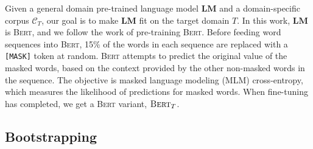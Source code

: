\documentclass[10pt, conference, compsocconf]{IEEEtran}
\newcommand{\bert}{\textsc{Bert}\xspace}
\begin{document}
Given a general domain pre-trained language model $\mathbf{LM}$ and a domain-specific corpus $\mathcal{C}_T$, 
our goal is to make $\mathbf{LM}$ fit on the target domain $T$.
In this work, $\mathbf{LM}$ is \bert, and we follow the work of pre-training \bert\cite{devlin2018bert}.
Before feeding word sequences into \bert, 
15\% of the words in each sequence are replaced with a {\tt [MASK]} token at random. 
\bert attempts to predict the original value of the masked words, 
based on the context provided by the other non-masked words in the sequence.
The objective is masked language modeling (MLM) cross-entropy\cite{devlin2018bert},
which measures the likelihood of predictions for masked words.
When fine-tuning has completed, we get a \bert variant, $\bert_T$.


\subsection{Bootstrapping}


\end{document}

